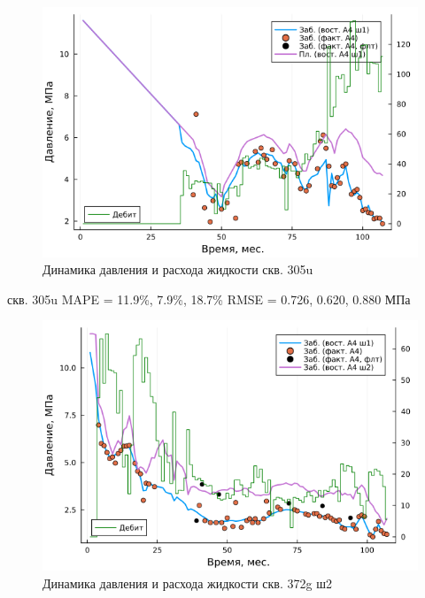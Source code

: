 \documentclass[14pt]{article}
\begin{document}
\begin{figure}[!htb]
	\centering
	\includegraphics[width=1.0\linewidth]{pic/pw_305u(3)_a4}
	\caption{Динамика давления и расхода жидкости скв. 305u}
	\label{fig:RMSE_A4_w2}
\end{figure}

скв. 305u
MAPE = 11.9\%, 7.9\%, 18.7\%
RMSE = 0.726, 0.620, 0.880 МПа


\begin{figure}[!htb]
	\centering
	\includegraphics[width=1.0\linewidth]{pic/pw_372g(13)_a4_stp2}
	\caption{Динамика давления и расхода жидкости скв. 372g ш2}
	\label{fig:RMSE_A4_w1}
\end{figure}
\end{document}
